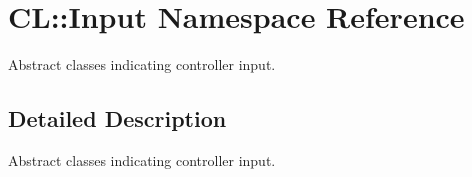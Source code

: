 \hypertarget{namespaceCL_1_1Input}{\section{\-C\-L\-:\-:\-Input \-Namespace \-Reference}
\label{namespaceCL_1_1Input}
}


\-Abstract classes indicating controller input.  




\subsection{\-Detailed \-Description}
\-Abstract classes indicating controller input. 